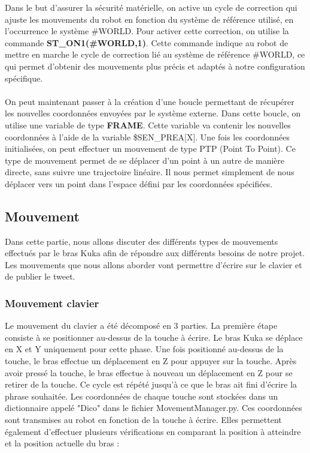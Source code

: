Dans le but d'assurer la sécurité matérielle, on active un cycle de correction qui ajuste les mouvements du robot en fonction du système de référence utilisé, en l'occurrence le système \#WORLD.
Pour activer cette correction, on utilise la commande \textbf{ST\_ON1(\#WORLD,1)}.
Cette commande indique au robot de mettre en marche le cycle de correction lié au système de référence \#WORLD, ce qui permet d'obtenir des mouvements plus précis et adaptés à notre configuration spécifique.
\\
\\
On peut maintenant passer à la création d'une boucle permettant de récupérer les nouvelles coordonnées envoyées par le système externe.
Dans cette boucle, on utilise une variable de type \textbf{FRAME}.
Cette variable va contenir les nouvelles coordonnées à l'aide de la variable \$SEN\_PREA[X].
Une fois les coordonnées initialisées, on peut effectuer un mouvement de type PTP (Point To Point).
Ce type de mouvement permet de se déplacer d'un point à un autre de manière directe, sans suivre une trajectoire linéaire.
Il nous permet simplement de nous déplacer vers un point dans l'espace défini par les coordonnées spécifiées.

\subsection{Mouvement}

Dans cette partie, nous allons discuter des différents types de mouvements effectués par le bras Kuka afin de répondre aux différents besoins de notre projet. 
Les mouvements que nous allons aborder vont permettre d'écrire sur le clavier et de publier le tweet.

\subsubsection{Mouvement clavier}

Le mouvement du clavier a été décomposé en 3 parties.
La première étape consiste à se positionner au-dessus de la touche à écrire.
Le bras Kuka se déplace en X et Y uniquement pour cette phase. 
Une fois positionné au-dessus de la touche, le bras effectue un déplacement en Z pour appuyer sur la touche. 
Après avoir pressé la touche, le bras effectue à nouveau un déplacement en Z pour se retirer de la touche. 
Ce cycle est répété jusqu'à ce que le bras ait fini d'écrire la phrase souhaitée.
Les coordonnées de chaque touche sont stockées dans un dictionnaire appelé "Dico" dans le fichier MovementManager.py.
Ces coordonnées sont transmises au robot en fonction de la touche à écrire.
Elles permettent également d'effectuer plusieurs vérifications en comparant la position à atteindre et la position actuelle du bras :

